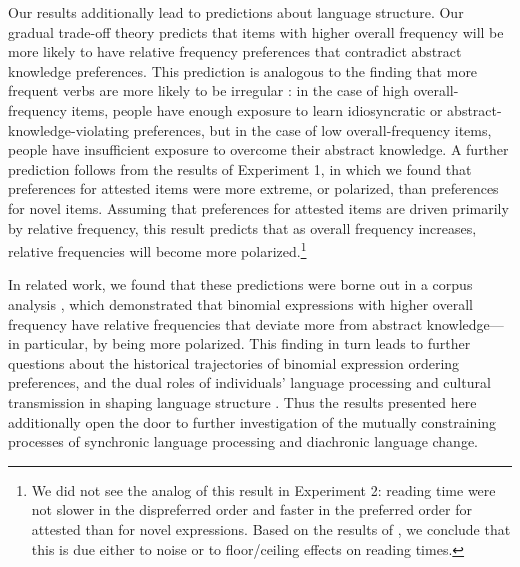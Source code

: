 \documentclass[authoryear]{elsarticle}
\begin{document}
Our results additionally lead to predictions about language structure. Our gradual trade-off theory predicts that items with higher overall frequency will be more likely to have relative frequency preferences that contradict abstract knowledge preferences. This prediction is analogous to the finding that more frequent verbs are more likely to be irregular \citep{Bybee:1985ty,Lieberman:2007bl}: in the case of high overall-frequency items, people have enough exposure to learn idiosyncratic or abstract-knowledge-violating preferences, but in the case of low overall-frequency items, people have insufficient exposure to overcome their abstract knowledge. A further prediction follows from the results of Experiment 1, in which we found that preferences for attested items were more extreme, or polarized, than preferences for novel items. Assuming that preferences for attested items are driven primarily by relative frequency, this result predicts that as overall frequency increases, relative frequencies will become more polarized.\footnote{We did not see the analog of this result in Experiment 2: reading time were not slower in the dispreferred order and faster in the preferred order for attested than for novel expressions. Based on the results of \citet{Morgan:2015to}, we conclude that this is due either to noise or to floor/ceiling effects on reading times.}

In related work, we found that these predictions were borne out in a corpus analysis \citep{Morgan:2015to}, which demonstrated that binomial expressions with higher overall frequency have relative frequencies that deviate more from abstract knowledge---in particular, by being more polarized. This finding in turn leads to further questions about the historical trajectories of binomial expression ordering preferences, and the dual roles of individuals' language processing and cultural transmission in shaping language structure \citep{Anonymous:GVZA8N7s,Morgan:2016vu}. Thus the results presented here additionally open the door to further investigation of the mutually constraining processes of synchronic language processing and diachronic language change.





\end{document}
